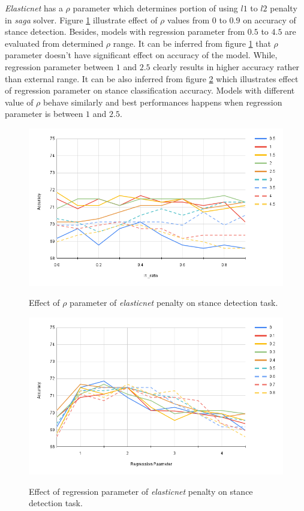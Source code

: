 \textit{Elasticnet} has a $\rho$ parameter which determines portion of using $l1$ to $l2$ penalty in \textit{saga} solver. Figure \ref{fig:logistic1} illustrate effect of $\rho$ values from $0$ to $0.9$ on accuracy of stance detection. Besides, models with regression parameter from $0.5$ to $4.5$ are evaluated from determined $\rho$ range. It can be inferred from figure \ref{fig:logistic1} that $\rho$ parameter doesn't have significant effect on accuracy of the model. While, regression parameter between $1$ and $2.5$ clearly results in higher accuracy rather than external range. It can be also inferred from figure \ref{fig:logistic2} which illustrates effect of regression parameter on stance classification accuracy. Models with different value of $\rho$ behave similarly and best performances happens when regression parameter is between $1$ and $2.5$.  
\begin{figure}%
	\centering
	{\includegraphics[width=12.5cm]{statistics/logistic_elastic1.png} }
	\caption{Effect of $\rho$ parameter of \textit{elasticnet} penalty on stance detection task.}%
	\label{fig:logistic1}%
\end{figure}
\begin{figure}%
	\centering
	{\includegraphics[width=12.5cm]{statistics/logistic_elastic2.png} }
	\caption{Effect of regression parameter of \textit{elasticnet} penalty on stance detection task.}%
	\label{fig:logistic2}%
\end{figure}

